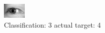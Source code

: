 \begin{figure}[h!]
\begin{center}
\includegraphics[width=0.60\columnwidth]{figures/ID3256_class_3_target_4.png}
\end{center}
\caption{ Classification: 3 actual target: 4}
\label{fig:ID3256_class_3_target_4}
\end{figure}
